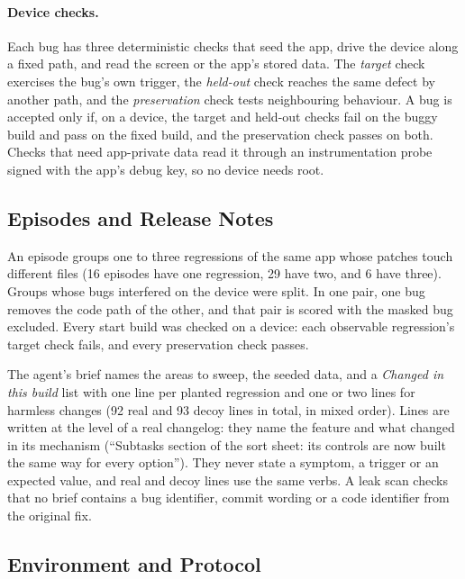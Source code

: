 \documentclass[sigconf]{acmart}
\begin{document}
\paragraph{Device checks.}
Each bug has three deterministic checks that seed the app, drive the device along a fixed path, and
read the screen or the app's stored data. The \emph{target} check exercises the bug's own trigger, the
\emph{held-out} check reaches the same defect by another path, and the \emph{preservation} check tests
neighbouring behaviour. A bug is accepted only if, on a device, the target and held-out checks fail on
the buggy build and pass on the fixed build, and the preservation check passes on both. Checks that
need app-private data read it through an instrumentation probe signed with the app's debug key, so no
device needs root.

\subsection{Episodes and Release Notes}
An episode groups one to three regressions of the same app whose patches touch different files (16
episodes have one regression, 29 have two, and 6 have three). Groups whose bugs interfered on the
device were split. In one pair, one bug removes the code path of the other, and that pair is scored
with the masked bug excluded. Every start build was checked on a device: each observable regression's
target check fails, and every preservation check passes.

The agent's brief names the areas to sweep, the seeded data, and a \emph{Changed in this build} list
with one line per planted regression and one or two lines for harmless changes (92 real and 93 decoy
lines in total, in mixed order). Lines are written at the level of a real changelog: they name the
feature and what changed in its mechanism (``Subtasks section of the sort sheet: its controls are now
built the same way for every option''). They never state a symptom, a trigger or an expected value,
and real and decoy lines use the same verbs. A leak scan checks that no brief contains a bug
identifier, commit wording or a code identifier from the original fix.

\subsection{Environment and Protocol}
\end{document}
